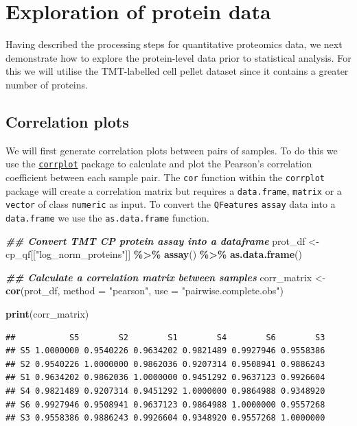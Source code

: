 \documentclass[9pt,a4paper,]{extarticle}
\newenvironment{Shaded}{\begin{snugshade}}{\end{snugshade}}
\newcommand{\AttributeTok}[1]{\textcolor[rgb]{0.13,0.29,0.53}{#1}}
\newcommand{\DocumentationTok}[1]{\textcolor[rgb]{0.56,0.35,0.01}{\textbf{\textit{#1}}}}
\newcommand{\FunctionTok}[1]{\textcolor[rgb]{0.13,0.29,0.53}{\textbf{#1}}}
\newcommand{\NormalTok}[1]{#1}
\newcommand{\OtherTok}[1]{\textcolor[rgb]{0.56,0.35,0.01}{#1}}
\newcommand{\SpecialCharTok}[1]{\textcolor[rgb]{0.81,0.36,0.00}{\textbf{#1}}}
\newcommand{\StringTok}[1]{\textcolor[rgb]{0.31,0.60,0.02}{#1}}
\begin{document}
\section{Exploration of protein data}\label{exploration-of-protein-data}

Having described the processing steps for quantitative proteomics data, we next
demonstrate how to explore the protein-level data prior to statistical analysis.
For this we will utilise the TMT-labelled cell pellet dataset since it contains
a greater number of proteins.

\subsection{Correlation plots}\label{correlation-plots}

We will first generate correlation plots between pairs of samples. To do this we
use the \href{https://cran.r-project.org/web/packages/corrplot/vignettes/corrplot-intro.html}{\texttt{corrplot}}
package to calculate and plot the Pearson's correlation coefficient between each
sample pair. The \texttt{cor} function within the \texttt{corrplot} package will create a
correlation matrix but requires a \texttt{data.frame}, \texttt{matrix} or a \texttt{vector} of class
\texttt{numeric} as input. To convert the \texttt{QFeatures} \texttt{assay} data into a \texttt{data.frame}
we use the \texttt{as.data.frame} function.

\begin{Shaded}
\begin{Highlighting}[]
\DocumentationTok{\#\# Convert TMT CP protein assay into a dataframe}
\NormalTok{prot\_df }\OtherTok{\textless{}{-}}\NormalTok{ cp\_qf[[}\StringTok{"log\_norm\_proteins"}\NormalTok{]] }\SpecialCharTok{\%\textgreater{}\%}
  \FunctionTok{assay}\NormalTok{() }\SpecialCharTok{\%\textgreater{}\%}
  \FunctionTok{as.data.frame}\NormalTok{()}

\DocumentationTok{\#\# Calculate a correlation matrix between samples}
\NormalTok{corr\_matrix }\OtherTok{\textless{}{-}} \FunctionTok{cor}\NormalTok{(prot\_df,}
                   \AttributeTok{method =} \StringTok{"pearson"}\NormalTok{,}
                   \AttributeTok{use =} \StringTok{"pairwise.complete.obs"}\NormalTok{)}

\FunctionTok{print}\NormalTok{(corr\_matrix)}
\end{Highlighting}
\end{Shaded}

\begin{verbatim}
##           S5        S2        S1        S4        S6        S3
## S5 1.0000000 0.9540226 0.9634202 0.9821489 0.9927946 0.9558386
## S2 0.9540226 1.0000000 0.9862036 0.9207314 0.9508941 0.9886243
## S1 0.9634202 0.9862036 1.0000000 0.9451292 0.9637123 0.9926604
## S4 0.9821489 0.9207314 0.9451292 1.0000000 0.9864988 0.9348920
## S6 0.9927946 0.9508941 0.9637123 0.9864988 1.0000000 0.9557268
## S3 0.9558386 0.9886243 0.9926604 0.9348920 0.9557268 1.0000000
\end{verbatim}
\end{document}
